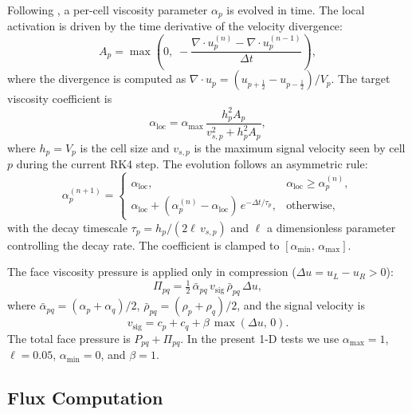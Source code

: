 \documentclass[twocolumn]{aastex63}
\newcommand{\vel}{{u}}
\begin{document}
Following \citet{cullen2010}, a per-cell viscosity parameter
$\alpha_p$ is evolved in time.
The local activation is driven by the time derivative of the velocity
divergence:
\begin{equation}
  A_p = \max\!\left(0,\;
    -\frac{\nabla\!\cdot\!\vel_p^{(n)} - \nabla\!\cdot\!\vel_p^{(n-1)}}
          {\Delta t}\right),
\end{equation}
where the divergence is computed as
$\nabla\!\cdot\!\vel_p = (\vel_{p+\frac{1}{2}} - \vel_{p-\frac{1}{2}})/V_p$.
The target viscosity coefficient is
\begin{equation}\label{eq:alphaloc}
  \alpha_\mathrm{loc} = \alpha_\mathrm{max}\,
    \frac{h_p^2 A_p}{v_{s,p}^2 + h_p^2 A_p},
\end{equation}
where $h_p = V_p$ is the cell size and $v_{s,p}$ is the maximum signal
velocity seen by cell $p$ during the current RK4 step.
The evolution follows an asymmetric rule:
\begin{equation}\label{eq:alphacd}
  \alpha_p^{(n+1)} = \begin{cases}
    \alpha_\mathrm{loc}, & \alpha_\mathrm{loc} \ge \alpha_p^{(n)},\\[4pt]
    \alpha_\mathrm{loc} + (\alpha_p^{(n)} - \alpha_\mathrm{loc})\,
      e^{-\Delta t / \tau_p}, & \text{otherwise},
  \end{cases}
\end{equation}
with the decay timescale $\tau_p = h_p / (2\ell\,v_{s,p})$ and
$\ell$ a dimensionless parameter controlling the decay rate.
The coefficient is clamped to $[\alpha_\mathrm{min},\,\alpha_\mathrm{max}]$.

The face viscosity pressure is applied only in compression
($\Delta\vel = \vel_L - \vel_R > 0$):
\begin{equation}
  \Pi_{pq} = \tfrac{1}{2}\,\bar\alpha_{pq}\,v_{\mathrm{sig}}\,
    \bar\rho_{pq}\,\Delta\vel,
\end{equation}
where $\bar\alpha_{pq} = (\alpha_p + \alpha_q)/2$,
$\bar\rho_{pq} = (\rho_p+\rho_q)/2$, and the signal velocity is
\begin{equation}
  v_{\mathrm{sig}} = c_p + c_q + \beta\,\max(\Delta\vel,\,0).
\end{equation}
The total face pressure is $P_{pq} + \Pi_{pq}$.
In the present 1-D tests we use $\alpha_\mathrm{max}=1$,
$\ell=0.05$, $\alpha_\mathrm{min}=0$, and $\beta=1$.


\subsection{Flux Computation}
\end{document}
